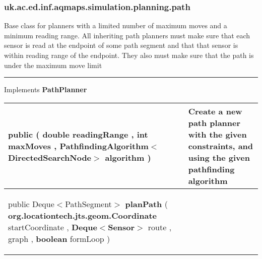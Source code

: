 \subsubsection*{ uk.ac.ed.inf.aqmaps.simulation.planning.path }
 {\scriptsize Base class for planners with a limited number of maximum moves and a\newline%
 minimum reading range. All inheriting path planners must make sure that each sensor is read at the endpoint of some path segment\newline%
 and that that sensor is within reading range of the endpoint. They also must make sure that the path is under the maximum move limit
 
\vspace*{4pt} \hrule \vspace*{3pt}
Implements \textbf{ PathPlanner }
\vspace*{-5pt} 
\begin{tabularx}{\linewidth}{X|m{}}
\label{tab:BasePathPlanner}
\begin{raggedleft}public  \textbf{\hyperref[tab:BasePathPlanner]{\color{blue}{BasePathPlanner}} }(\newline \hfill 
\hspace*{ 5pt} \textbf{double} readingRange , \newline
 \hspace*{ 5pt} \textbf{int} maxMoves , \newline
 \hspace*{ 5pt} \textbf{PathfindingAlgorithm$<$DirectedSearchNode$>$} algorithm  )
\end{raggedleft} &
 Create a new path planner with the given constraints, and using the given pathfinding algorithm\\ \hline 
\begin{raggedleft}public Deque$<$PathSegment$>$ \textbf{planPath }(\newline \hfill 
\hspace*{ 5pt} \textbf{org.locationtech.jts.geom.Coordinate} startCoordinate , \newline
 \hspace*{ 5pt} \textbf{Deque$<$Sensor$>$} route , \newline
 \hspace*{ 5pt} \textbf{\hyperref[tab:ConstrainedTreeGraph]{\color{blue}{ConstrainedTreeGraph}}} graph , \newline
 \hspace*{ 5pt} \textbf{boolean} formLoop  )

\end{raggedleft}
\end{tabularx}}
